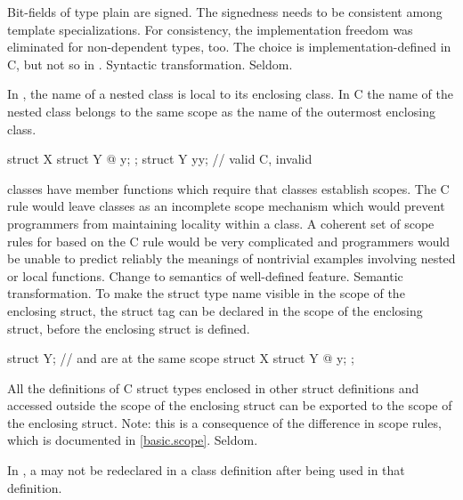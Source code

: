 \change
{}%
Bit-fields of type plain  are signed.
\rationale
The signedness needs to be consistent among template specializations.
For consistency,
the implementation freedom was eliminated for non-dependent types,
too.
\effect
The choice is implementation-defined in C, but not so in \Cpp{}.
\difficulty
Syntactic transformation.
\howwide
Seldom.

\change
In \Cpp{}, the name of a nested class is local to its enclosing class. In C
the name of the nested class belongs to the same scope as the name of the outermost enclosing class.

\begin{example}
\begin{codeblock}
struct X {
  struct Y { @\commentellip@ } y;
};
struct Y yy;                    // valid C, invalid \Cpp{}
\end{codeblock}
\end{example}
\rationale
\Cpp{} classes have member functions which require that classes
establish scopes.
The C rule would leave classes as an incomplete scope mechanism
which would prevent \Cpp{} programmers from maintaining locality
within a class.
A coherent set of scope rules for \Cpp{} based on the C rule would
be very complicated and \Cpp{} programmers would be unable to predict
reliably the meanings of nontrivial examples involving nested or
local functions.
\effect
Change to semantics of well-defined feature.
\difficulty
Semantic transformation.
To make the struct type name visible in the scope of the enclosing
struct, the struct tag can be declared in the scope of the
enclosing struct, before the enclosing struct is defined.
\begin{example}
\begin{codeblock}
struct Y;                       //  and  are at the same scope
struct X {
  struct Y { @\commentellip@ } y;
};
\end{codeblock}
\end{example}

All the definitions of C struct types enclosed in other struct
definitions and accessed outside the scope of the enclosing
struct can be exported to the scope of the enclosing struct.
Note: this is a consequence of the difference in scope rules,
which is documented in \ref{basic.scope}.
\howwide
Seldom.

\change
In \Cpp{}, a  may not be redeclared in a class definition after being used in that definition.

